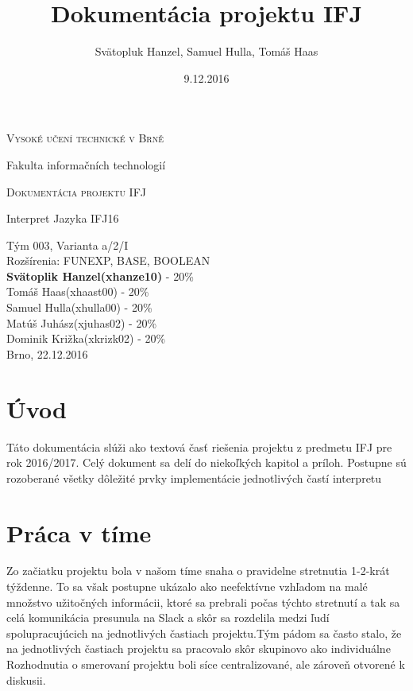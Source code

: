 \documentclass[12pt, a4paper]{article}
\title{Dokumentácia projektu IFJ}
\author{Svätopluk Hanzel, Samuel Hulla, Tomáš Haas}
\date{9.12.2016}
\begin{document}
    \begin{titlepage}
        \begin{center}
        {\scshape\LARGE Vysoké učení technické v Brně \par}
        {\Large Fakulta informačních technologií\par}
        \vspace{3cm}
        {\scshape\LARGE Dokumentácia projektu IFJ\par}
        {\Large Interpret Jazyka IFJ16 \par}
        \vfill
        {\Large Tým 003, Varianta a/2/I}\\
        Rozšírenia: FUNEXP, BASE, BOOLEAN\\
        \vspace{1cm}
        \textbf{Svätoplik Hanzel(xhanze10)} - 20\% \\
        Tomáš Haas(xhaast00) - 20\% \\
        Samuel Hulla(xhulla00) - 20\% \\
        Matúš Juhász(xjuhas02) - 20\% \\
        Dominik Križka(xkrizk02) - 20\% \\
        \vspace{1cm}
        {\hfill Brno, 22.12.2016}
        \end{center}
    \end{titlepage}

    \tableofcontents{}
    \newpage
    \setcounter{page}{1}
    \section{Úvod}
    Táto dokumentácia slúži ako textová časť riešenia projektu z predmetu IFJ pre rok 2016/2017. Celý dokument sa delí do niekoľkých kapitol a príloh. Postupne sú rozoberané všetky dôležité prvky implementácie jednotlivých častí interpretu
    \newpage
    \section{Práca v tíme}
     Zo začiatku projektu bola v našom tíme snaha o pravidelne stretnutia 1-2-krát týždenne. To sa však postupne ukázalo ako neefektívne vzhľadom na malé množstvo užitočných informácii, ktoré sa prebrali počas týchto stretnutí a tak sa celá komunikácia presunula na Slack a skôr sa rozdelila medzi ľudí spolupracujúcich na jednotlivých častiach projektu.Tým pádom sa často stalo, že na jednotlivých častiach projektu sa pracovalo skôr skupinovo ako individuálne \\
	 Rozhodnutia o smerovaní projektu boli síce centralizované, ale zároveň otvorené k diskusii.
\end{document}
